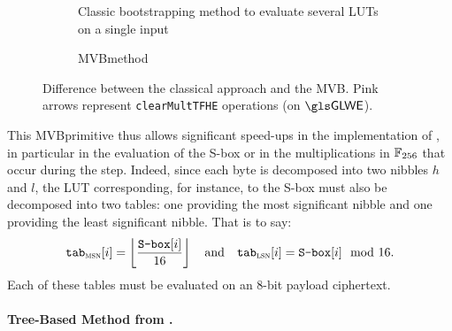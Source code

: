 \begin{figure}
	\centering
	\begin{subfigure}[t]{\linewidth}
		\centering
		\mvbFigureA %
		\caption{Classic bootstrapping method to evaluate several LUTs on a single input}
		\label{fig:mvbA}
	\end{subfigure}
	
	\vspace{1.5em} %
	
	\begin{subfigure}[t]{\textwidth}
		\centering
		\mvbFigureB %
		\caption{\gls{MVB}method}
		\label{fig:mvbB}
	\end{subfigure}
	
	\caption{Difference between the classical approach and the MVB. Pink arrows represent \texttt{clearMultTFHE} operations (on $\GLWE$).}
	\label{fig:mvb}
\end{figure}

This \gls{MVB}primitive thus allows significant speed-ups in the implementation of \cite{DBLP:conf/wahc/TramaCBS23}, in particular in the evaluation of the S-box or in the multiplications in $\mathbb{F}_{256}$ that occur during the \MixColumns step. Indeed, since each byte is decomposed into two nibbles $h$ and $l$, the \gls{LUT} corresponding, for instance, to the S-box must also be decomposed into two tables: one providing the most significant nibble and one providing the least significant nibble. That is to say: 
$$
\texttt{tab}_{\textsc{msn}}[i] = \left\lfloor \frac{\texttt{S-box}[i]}{16} \right\rfloor \quad \text{and} \quad \texttt{tab}_{\textsc{lsn}}[i] = \texttt{S-box}[i] \mod 16.
$$
Each of these tables must be evaluated on an 8-bit payload ciphertext. 


\paragraph{Tree-Based Method from \cite{DBLP:conf/wahc/TramaCBS23}.}
\label{prim:tbb}


